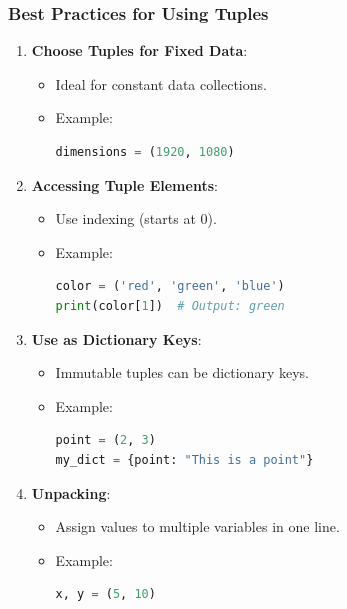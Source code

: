 \documentclass{beamer}
\begin{document}
\begin{frame}[fragile]
    \frametitle{Best Practices for Using Tuples}
    \begin{enumerate}
        \item \textbf{Choose Tuples for Fixed Data}:
            \begin{itemize}
                \item Ideal for constant data collections.
                \item Example: 
                \begin{lstlisting}[language=Python]
dimensions = (1920, 1080)
                \end{lstlisting}
            \end{itemize}

        \item \textbf{Accessing Tuple Elements}:
            \begin{itemize}
                \item Use indexing (starts at 0).
                \item Example:
                \begin{lstlisting}[language=Python]
color = ('red', 'green', 'blue')
print(color[1])  # Output: green
                \end{lstlisting}
            \end{itemize}

        \item \textbf{Use as Dictionary Keys}:
            \begin{itemize}
                \item Immutable tuples can be dictionary keys.
                \item Example:
                \begin{lstlisting}[language=Python]
point = (2, 3)
my_dict = {point: "This is a point"}
                \end{lstlisting}
            \end{itemize}

        \item \textbf{Unpacking}:
            \begin{itemize}
                \item Assign values to multiple variables in one line.
                \item Example:
                \begin{lstlisting}[language=Python]
x, y = (5, 10)
                \end{lstlisting}
            \end{itemize}
    \end{enumerate}
\end{frame}
\end{document}
